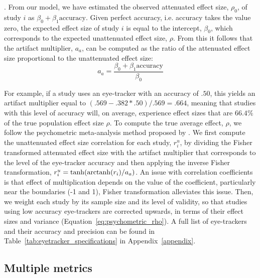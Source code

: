 \citep{hunter2004a}. From our model, we have estimated the observed attenuated effect size, $\rho_0$, of study $i$ as $\beta_0 + \beta_1 \textrm{accuracy}$. Given perfect accuracy, i.e. accuracy takes the value zero, the expected effect size of study $i$ is equal to the intercept, $\beta_0$, which corresponds to the expected unattenuated effect size, $\rho$. From this it follows that the artifact multiplier, $a_a$, can be computed as the ratio of the attenuated effect size proportional to the unattenuated effect size:
%
\begin{equation}
\label{eq:artifact_multiplier}
a_a = \frac{\beta_0 + \beta_1 \textrm{accuracy}}{\beta_0}
\end{equation}

For example, if a study uses an eye-tracker with an accuracy of $.50$, this yields an artifact multiplier equal to $(.569 - .382*.50)/.569 = .664$, meaning that studies with this level of accuracy will, on average, experience effect sizes that are $66.4\%$ of the true population effect size $\rho$. To compute the true average effect, $\rho$, we follow the psychometric meta-analysis method proposed by \cite{hunter2004a}. We first compute the unattenuated effect size correlation for each study, $r_i^u$, by dividing the Fisher transformed attenuated effect size with the artifact multiplier that corresponds to the level of the eye-tracker accuracy and then applying the inverse Fisher transformation, $r_i^u = \tanh(\operatorname{arctanh}(r_i)/a_a)$. An issue with correlation coefficients is that effect of multiplication depends on the value of the coefficient, particularly near the boundaries (-1 and 1), Fisher transformation alleviates this issue. Then, we weight each study by its sample size and its level of validity, so that studies using low accuracy eye-trackers are corrected upwards, in terms of their effect sizes and variance (Equation~\ref{eq:psychometric_rho}). A full list of eye-trackers and their accuracy and precision can be found in Table~\ref{tab:eyetracker_specifications} in Appendix~\ref{appendix}.


\subsection{Multiple metrics}

